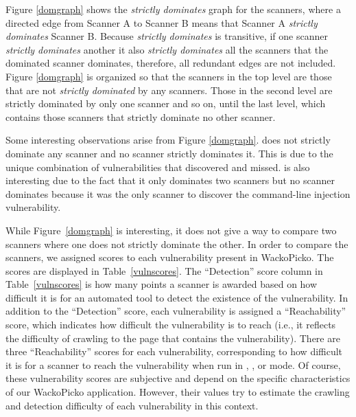 

Figure \ref{domgraph} shows the \emph{strictly dominates} graph for the
scanners, where a directed edge from Scanner A to Scanner B means
that Scanner A \emph{strictly dominates} Scanner B. Because \emph{strictly
  dominates} is transitive, if one scanner \emph{strictly dominates} another
it also \emph{strictly dominates} all the scanners that the dominated
scanner dominates, therefore, all redundant edges are not
included. Figure \ref{domgraph} is organized so that the scanners in
the top level are 
those that are not \emph{strictly dominated} by any scanners. Those in the
second level are strictly dominated by only one scanner and so on, until the
last level, which contains those scanners that strictly dominate no other scanner.

Some interesting observations arise from Figure \ref{domgraph}. \nstalker{}
does not strictly dominate any scanner and no scanner strictly dominates it.
This is due to the unique combination of vulnerabilities that \nstalker{}
discovered and missed.
%
\burp{} is also interesting due to the fact that it only dominates two
scanners but no scanner dominates \burp{} because it was the only
scanner to discover the command-line injection vulnerability. 



While Figure~\ref{domgraph} is interesting, it does not give a way to compare
two scanners where one does not strictly dominate the other. In order to
compare the scanners, we assigned scores to each vulnerability present in
WackoPicko. The scores are displayed in Table~\ref{vulnscores}. The ``Detection''
score column in Table~\ref{vulnscores} is how many points a
scanner is awarded based on how difficult it is for an automated tool to detect the existence of the
vulnerability. In addition to the ``Detection'' score, each
vulnerability is assigned a ``Reachability'' score, which indicates how difficult
the vulnerability is to reach (i.e., it reflects the difficulty of crawling to the page that contains the vulnerability). 
There are three ``Reachability'' scores for
each vulnerability, corresponding to how difficult it is for a scanner to
reach the vulnerability when run in \initial{}, \config{}, or \manual{} mode.
Of course, these vulnerability scores are subjective and depend on the
specific characteristics of our WackoPicko application. However, their
values try to estimate the crawling and detection difficulty of each
vulnerability in this context.

